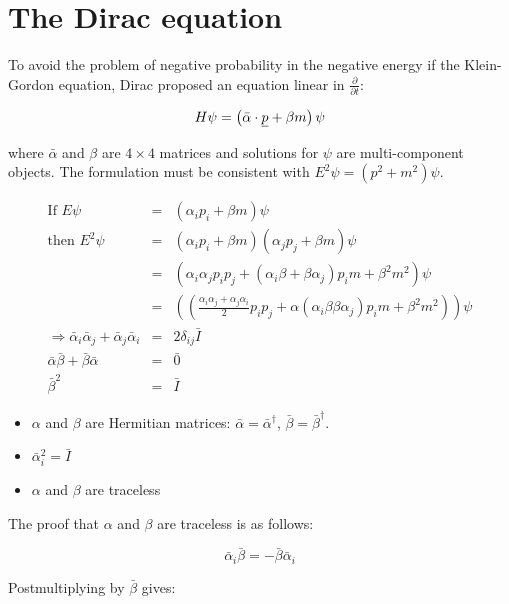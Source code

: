 \section{The Dirac equation}

To avoid the problem of negative probability in the negative energy if the Klein-Gordon equation, Dirac proposed an equation linear in $\frac{\partial}{\partial t}$:

\[
  H\psi = \left(\bar{\alpha}\cdot\underline{p} + \beta m\right)\psi
\]

where $\bar{\alpha}$ and $\beta$ are $4\times 4$ matrices and solutions for $\psi$ are multi-component objects.  The formulation must be consistent with $E^2\psi = \left(p^2 + m^2\right)\psi$.

\begin{eqnarray*}
  \textrm{If } E\psi & = & \left(\alpha_ip_i + \beta m\right)\psi \\
  \textrm{then } E^2\psi & = & \left(\alpha_ip_i + \beta m\right)\left(\alpha_j p_j + \beta m\right)\psi \\
  & = & \left(\alpha_i\alpha_jp_ip_j + \left(\alpha_i\beta + \beta\alpha_j\right)p_im + \beta^2m^2\right)\psi \\
  & = & \left( \left(\frac{\alpha_i\alpha_j + \alpha_j\alpha_i}{2}p_ip_j + \alpha\left(\alpha_i\beta \beta\alpha_j\right)p_im + \beta^2m^2\right)\right)\psi \\
  \Rightarrow \bar{\alpha}_i\bar{\alpha}_j + \bar{\alpha}_j\bar{\alpha}_i & = & 2\delta_{ij}\bar{I} \\
  \bar{\alpha}\bar{\beta} + \bar{\beta}\bar{\alpha} & = & \bar{0} \\
  \bar{\beta}^2 & = & \bar{I}
\end{eqnarray*}

\begin{itemize}
  \item $\alpha$ and $\beta$ are Hermitian matrices: $\bar{\alpha} = \bar{\alpha}^{\dagger}$, $\bar{\beta} = \bar{\beta}^{\dagger}$.
  \item $\bar{\alpha}_i^2 = \bar{I}$
  \item $\alpha$ and $\beta$ are traceless
\end{itemize}

The proof that $\alpha$ and $\beta$ are traceless is as follows:

\[
  \bar{\alpha}_i\bar{\beta} = -\bar{\beta}\bar{\alpha}_i
\]

Postmultiplying by $\bar{\beta}$ gives:

